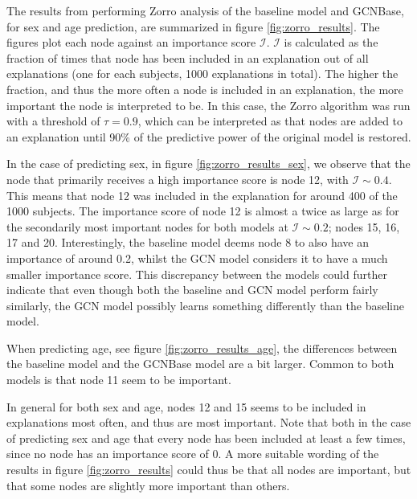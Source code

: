 The results from performing Zorro analysis of the baseline model and GCNBase, for sex and age prediction, are summarized in figure \ref{fig:zorro_results}. The figures plot each node against an importance score $\mathcal{I}$. $\mathcal{I}$ is calculated as the fraction of times that node has been included in an explanation out of all explanations (one for each subjects, 1000 explanations in total). The higher the fraction, and thus the more often a node is included in an explanation, the more important the node is interpreted to be. In this case, the Zorro algorithm was run with a threshold of $\tau = 0.9$, which can be interpreted as that nodes are added to an explanation until 90\% of the predictive power of the original model is restored.

In the case of predicting sex, in figure \ref{fig:zorro_results_sex}, we observe that the node that primarily receives a high importance score is node 12, with $\mathcal{I}\sim 0.4$. This means that node 12 was included in the explanation for around 400 of the 1000 subjects. The importance score of node 12 is almost a twice as large as for the secondarily most important nodes for both models at $\mathcal{I} \sim 0.2$; nodes 15, 16, 17 and 20. Interestingly, the baseline model deems node 8 to also have an importance of around 0.2, whilst the GCN model considers it to have a much smaller importance score. This discrepancy between the models could further indicate that even though both the baseline and GCN model perform fairly similarly, the GCN model possibly learns something differently than the baseline model. 

When predicting age, see figure \ref{fig:zorro_results_age}, the differences between the baseline model and the GCNBase model are a bit larger. Common to both models is that node 11 seem to be important. 

In general for both sex and age, nodes 12 and 15 seems to be included in explanations most often, and thus are most important. Note that both in the case of predicting sex and age that every node has been included at least a few times, since no node has an importance score of 0. A more suitable wording of the results in figure \ref{fig:zorro_results} could thus be that all nodes are important, but that some nodes are slightly more important than others. 

